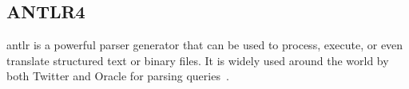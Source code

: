 
\subsection{ANTLR4}
\gls{antlr} is a powerful parser generator that can be used to process, execute, or even translate structured text or binary files. It is widely used around the world by both Twitter and Oracle for parsing queries~\cite{ANTLR_About}.

